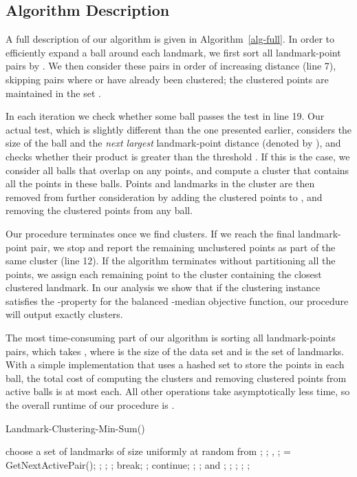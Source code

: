 \documentclass{llncs} \usepackage{algorithm}
\begin{document}
\subsection{Algorithm Description}

A full description of our algorithm is given in Algorithm~\ref{alg-full}.  In order to efficiently expand a ball around each landmark, we first sort all landmark-point pairs  by .  We then consider these pairs in order of increasing distance (line 7), skipping pairs where  or  have already been clustered; the clustered points are maintained in the set .

In each iteration we check whether some ball  passes the test in line 19.  Our actual test, which is slightly different than the one presented earlier, considers the size of the ball and the \emph{next largest} landmark-point distance (denoted by ), and checks whether their product is greater than the threshold .  If this is the case, we consider all balls that overlap  on any points, and compute a cluster that contains all the points in these balls.  Points and landmarks in the cluster are then removed from further consideration by adding the clustered points to , and removing the clustered points from any ball.

Our procedure terminates once we find  clusters.  If we reach the final landmark-point pair, we stop and report the remaining unclustered points as part of the same cluster (line 12).  If the algorithm terminates without partitioning all the points, we assign each remaining point to the cluster containing the closest clustered landmark.  In our analysis we show that if the clustering instance satisfies the -property for the balanced -median objective function, our procedure will output exactly  clusters.

The most time-consuming part of our algorithm is sorting all landmark-points pairs, which takes , where  is the size of the data set and  is the set of landmarks.  With a simple implementation that uses a hashed set to store the points in each ball, the total cost of computing the clusters and removing clustered points from active balls is at most  each.  All other operations take asymptotically less time, so the overall runtime of our procedure is .

\begin{algorithm}[H]
\caption{Landmark-Clustering-Min-Sum()}
\begin{algorithmic}[1]
\STATE choose a set of landmarks  of size  uniformly at random from ;
\STATE ;
\ENDFOR
\STATE , ;
\WHILE{}
\STATE  = GetNextActivePair();
\STATE ;
\STATE ;
\ELSE
\STATE ;
\STATE break;
\ENDIF
\STATE ;
\IF{}
\STATE continue;
\ENDIF
{}
\STATE ;
\STATE ;
\STATE  and ;
\STATE ;
\STATE ;
\ENDFOR
\ENDFOR
\STATE ;
\ENDWHILE
\ENDWHILE
\RETURN ;
\end{algorithmic}
\label{alg-full}
\end{algorithm}
\end{document}
